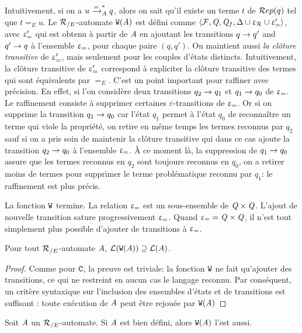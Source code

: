 Intuitivement, si on a $u \xrightarrow{=}^*_{A} q$, alors on sait qu'il existe
un terme $t$ de $\mathcal R ep(q)$ tel que $t =_E u$. Le ${\mathcal R_{/E}}$-automate
$\mathtt{W}(A)$ est défini comme $\langle \mathcal{F}, \mathit Q, \mathit Q_f, \Delta \cup \upvarepsilon_{\mathcal R} \cup \upvarepsilon_{=}' \rangle$,
avec $\upvarepsilon_{=}'$ qui est obtenu à partir de $\mathit A$ en ajoutant les transitions $q \rightarrow q'$ and $q'
\rightarrow q$ à  l'ensemble $\upvarepsilon_{=}$, pour chaque paire $(q, q')$. On maintient aussi {\em
  la clôture transitive} de  $\upvarepsilon_{=}'$, mais seulement pour les couples d'états distincts.
Intuitivement, la clôture transitive de $\upvarepsilon_{=}'$ correspond à expliciter la
clôture transitive des termes qui sont équivalents par $=_E$. 
C'est un point important pour raffiner avec précision.
En effet, si l'on considère deux transitions  $q_2 \rightarrow q_1$ et $q_1 \rightarrow q_0$ de $\upvarepsilon_{=}$. 
Le raffinement consiste à supprimer certaines $\varepsilon$-transitions de $\upvarepsilon_{=}$. Or si on supprime 
la transition $q_1 \rightarrow q_0$ car l'état $q_1$ permet à l'état $q_0$ de reconnaître un terme
qui viole la propriété, on retire en même temps les termes reconnus par $q_2$ sauf si on 
a pris soin de maintenir la clôture transitive qui dans ce cas ajoute la transition $q_2 \rightarrow q_0$
à l'ensemble $\upvarepsilon_{=}$. À ce moment là, la suppression de $q_1 \rightarrow q_0$ assure que les termes reconnus en 
$q_2$ sont toujours reconnus en $q_0$, on a retirer moins de termes pour supprimer le terme problématique
reconnu par $q_1$: le raffinement est plus précis.

\begin{remark}
  La fonction $\mathtt{W}$ termine. La relation $\upvarepsilon_{=}$ est un sous-ensemble de $\mathit Q \times \mathit Q$.
  L'ajout de nouvelle transition sature progressivement $\upvarepsilon_{=}$. Quand $\upvarepsilon_{=} = \mathit Q \times \mathit Q$,
  il n'est tout simplement plus possible d'ajouter de transitions à $\upvarepsilon_{=}$.
\end{remark}



\begin{lemma}
  Pour tout ${\mathcal R_{/E}}$-automate $\mathit A$, $\mathcal{L}(\mathtt{W}(\mathit A)) \supseteq \mathcal{L}(\mathit A)$.
\end{lemma}
\begin{proof}
Comme pour $\mathtt{C}$, la preuve est triviale: la fonction $\mathtt{W}$ ne fait qu'ajouter des transitions, 
ce qui ne restreint en aucun cas le langage reconnu. Par conséquent, un critère syntaxique sur l'inclusion
des ensembles d'états et de transitions est suffisant : toute exécution de $\mathit A$ peut être rejouée par $\mathtt{W}(\mathit A)$
\end{proof}


\begin{lemma}
  Soit $\mathit A$ un ${\mathcal R_{/E}}$-automate. Si $\mathit A$ est bien défini, alors $\mathtt{W}(\mathit A)$ l'est aussi.
\end{lemma}

